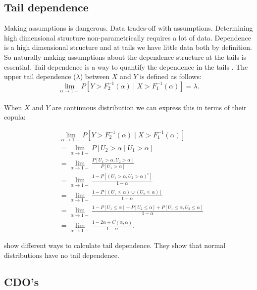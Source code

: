 \documentclass[a4paper,12pt]{article}
\begin{document}
\subsection{Tail dependence}
Making assumptions is dangerous. Data trades-off with assumptions.
Determining high dimensional structure non-parametrically requires a lot of data.
Dependence is a high dimensional structure and at
tails we have little data both by definition. So naturally making
assumptions about the dependence structure at the tails is essential.
Tail dependence is a way to quantify the dependence in the tails .
The upper tail dependence ($\lambda$) between $X$ and $Y$ is defined as follows:
\begin{equation}
    \lim_{\alpha \to 1-}  P[ Y > F_{2}^{-1} ( \alpha) \mid X > F_{1}^{-1} ( \alpha) ]=\lambda.
\end{equation} \\
When $X$ and $Y$ are continuous distribution we can express this in terms
of their copula:

\begin{align}
     & \lim_{\alpha \to 1-}  P[ Y > F_{2}^{-1} ( \alpha) \mid X > F_{1}^{-1} ( \alpha) ]                                          \\
     & =\lim_{\alpha \to 1-}  P[ U_{2} >  \alpha \mid U_{1} >  \alpha ]                                                           \\
     & =\lim_{\alpha \to 1-}  \frac{P[U_{1}>\alpha,U_{2}>\alpha]}{P[U_{1}>\alpha]}                                                \\
     & =\lim_{\alpha \to 1-}  \frac{1 - P[(U_{1}>\alpha,U_{2}>\alpha)^{c}]}{1-\alpha}                                             \\
     & =\lim_{\alpha \to 1-}  \frac{1 - P[(U_{1}\le \alpha) \cup ( U_{2}\le\alpha)]}{1-\alpha}                                    \\
     & =\lim_{\alpha \to 1-}  \frac{1 - P[U_{1}\le \alpha] - P[U_{2}\le \alpha]  + P[U_{1}\le \alpha , U_{2}\le\alpha]}{1-\alpha} \\
     & =\lim_{\alpha\to1-} \frac{1-2 \alpha +C(\alpha,\alpha)} {1-\alpha}.
\end{align}

\cite{dempster_correlation_2002} show different ways to calculate tail dependence. They show
that normal distributions have no tail dependence.

\subsection{CDO's}
\end{document}
